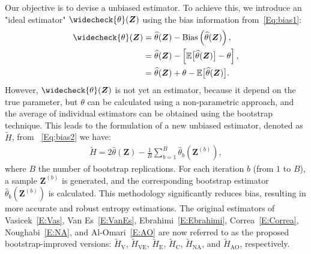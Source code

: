 Our objective is to devise a unbiased estimator. To achieve this, we introduce an "ideal estimator" \(\widecheck{\theta}(\bm{Z})\) using the bias information from~\eqref{Eq:bias1}:
\begin{align}
\label{Eq:bias2}
\widecheck{\theta}(\bm{Z}) &= \widehat{\theta}(\bm{Z}) - \bias\left(\widehat{\theta}(\bm{Z})\right),\nonumber\\
&=\widehat{\theta}(\bm{Z})-\left[\mathbb{E}\big[\widehat{\theta}(\bm{Z})\big] - \theta\right],\nonumber\\
&=\widehat{\theta}(\bm{Z})+\theta-\mathbb{E}\big[\widehat{\theta}(\bm{Z})\big].
\end{align}
However, \(\widecheck{\theta}(\bm{Z})\) is not yet an estimator, because it depend on the true parameter, but \(\theta\) can be calculated using a non-parametric approach, and the average of individual estimators can be obtained using the bootstrap technique. This leads to the formulation of a new unbiased estimator, denoted as \(\widetilde{H}\), from ~\eqref{Eq:bias2} we have:
\begin{align}
\label{Eq:bias3}
\widetilde{H}%
= 2\widehat{\theta}(\bm{Z}) - \frac{1}{B}\sum_{b=1}^B \widehat{\theta}_b(\bm{Z}^{(b)}),
\end{align} where \(B\) the number of bootstrap replications. For each iteration \(b\) (from \(1\) to \(B\)), a sample \(\bm{Z}^{(b)}\) is generated, and the corresponding bootstrap estimator \(\widehat{\theta}_b(\bm{Z}^{(b)})\) is calculated. 
This methodology significantly reduces bias, resulting in more accurate and robust entropy estimations. The original estimators of Vasicek~\eqref{E:Vas}, Van Es~\eqref{E:VanEs}, Ebrahimi~\eqref{E:Ebrahimi}, Correa~\eqref{E:Correa}, Noughabi~\eqref{E:NA}, and Al-Omari~\eqref{E:AO}  are now referred to as the proposed bootstrap-improved versions:
\(\widetilde{H}_{\text{V}}\),
\(\widetilde{H}_{\text{VE}}\), 
\(\widetilde{H}_{\text{E}}\),
\(\widetilde{H}_{\text{C}}\),
\(\widetilde{H}_{\text{NA}}\), and 
\(\widetilde{H}_{\text{AO}}\),
respectively.


